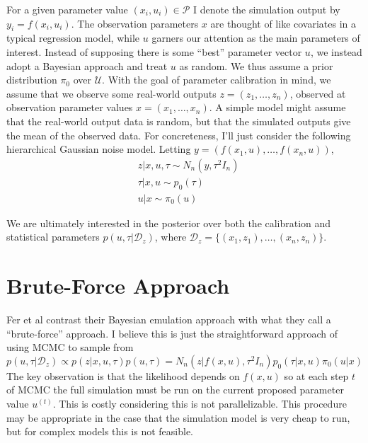 \documentclass[12pt]{article}
\begin{document}
For a given parameter value $(x_i, u_i) \in \mathcal{P}$ I denote the simulation output by $y_i = f(x_i, u_i)$.
The observation parameters $x$ are thought of like covariates in a typical regression model, while $u$ garners our attention as the main parameters of interest. Instead of supposing 
there is some ``best'' parameter vector $u$, we instead adopt a Bayesian approach and treat $u$ as random. 
 We thus assume a prior distribution $\pi_0$ over $\mathcal{U}$. 
With the goal of parameter calibration in mind, we assume that we observe some real-world outputs $z = (z_1, \dots, z_n)$, observed at observation parameter values 
$x = (x_1, \dots, x_n)$. A simple model might assume that the real-world output data is random, but that the simulated outputs give the mean of the observed data. 
For concreteness, I'll just consider the following hierarchical Gaussian noise model. Letting $y = (f(x_1, u), \dots, f(x_n, u))$,
\begin{align*}
&z|x, u, \tau \sim N_n(y, \tau^2 I_n) \\
&\tau|x, u \sim p_0(\tau) \\
&u|x \sim \pi_0(u)
\end{align*}

We are ultimately interested in the posterior over both the calibration and statistical parameters $p(u, \tau|\mathcal{D}_z)$, where $\mathcal{D}_z = \{(x_1, z_1), \dots, (x_n, z_n)\}$.  

\section{Brute-Force Approach}
Fer et al contrast their Bayesian emulation approach with what they call a ``brute-force'' approach. I believe this is just the straightforward approach of using MCMC to sample from 
\[p(u, \tau|\mathcal{D}_z) \propto p(z|x, u, \tau)p(u, \tau) = N_n(z|f(x, u), \tau^2 I_n)p_0(\tau|x, u)\pi_0(u|x)\] 
The key observation is that the likelihood depends on $f(x, u)$ so at each step $t$ of MCMC the full simulation must be run on the current proposed parameter value $u^{(t)}$. This is costly considering this is not parallelizable. This procedure may be appropriate in the case that the simulation model is very cheap to run, but for complex models this is not 
feasible. 

\end{document}
